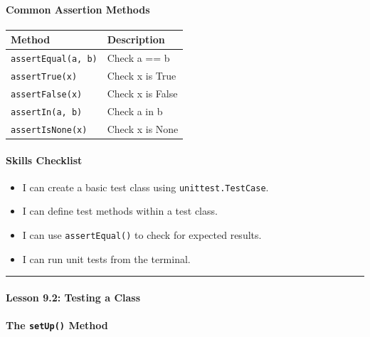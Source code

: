 \documentclass[
  justified,
  openright,
]{tufte-book}
\let\subsection\paragraph
\let\paragraph\paragraph
\let\subsection\paragraph
\let\paragraph\paragraph
\providecommand{\tightlist}{%
  \setlength{\itemsep}{0pt}\setlength{\parskip}{0pt}}
\begin{document}
\subsection{Common Assertion Methods}\label{common-assertion-methods}

\begin{fullwidth}{\def\LTcaptype{none} %
\begin{longtable}[]{@{}ll@{}}
\toprule\noalign{}
Method & Description \\
\midrule\noalign{}
\endhead
\bottomrule\noalign{}
\endlastfoot
\texttt{assertEqual(a,\ b)} & Check a == b \\
\texttt{assertTrue(x)} & Check x is True \\
\texttt{assertFalse(x)} & Check x is False \\
\texttt{assertIn(a,\ b)} & Check a in b \\
\texttt{assertIsNone(x)} & Check x is None \\
\end{longtable}
}
\end{fullwidth}

\subsection{Skills Checklist}\label{skills-checklist-42}

\begin{itemize}
\tightlist
\item[$\square$]
  I can create a basic test class using \texttt{unittest.TestCase}.
\item[$\square$]
  I can define test methods within a test class.
\item[$\square$]
  I can use \texttt{assertEqual()} to check for expected results.
\item[$\square$]
  I can run unit tests from the terminal.
\end{itemize}

\begin{center}\rule{0.5\linewidth}{0.5pt}\end{center}

\subsection{Lesson 9.2: Testing a
Class}\label{lesson-9.2-testing-a-class}

\subsection{\texorpdfstring{The \texttt{setUp()}
Method}{The setUp() Method}}\label{the-setup-method}
\end{document}
